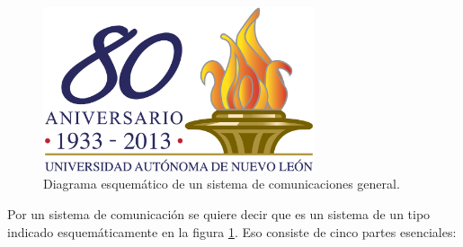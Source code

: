 \begin{figure}[!ht]
\centerline{\includegraphics[width=80mm]{ejemplo.png}}
\caption{Diagrama esquem\'{a}tico de un sistema de comunicaciones
  general.}
\label{fig:1}
\end{figure}

Por un sistema de comunicaci\'{o}n se quiere decir que es un sistema
de un tipo indicado esquem\'{a}ticamente en la figura \ref{fig:1}. Eso
consiste de cinco partes esenciales:

